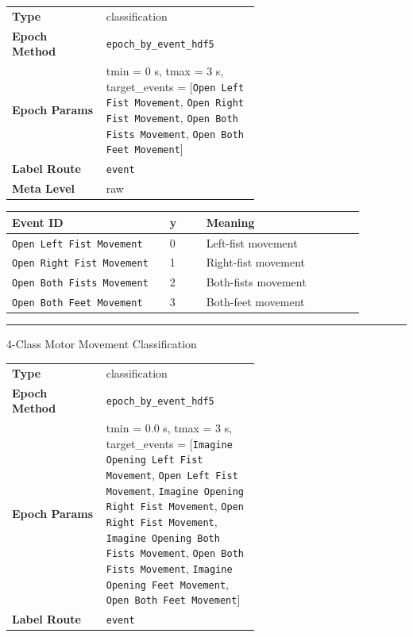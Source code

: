 {\begin{tcolorbox}
{\footnotesize\begin{tabular}{@{}lp{0.62\linewidth}@{}}
\textbf{Type} & classification \\
\textbf{Epoch Method} & \texttt{epoch\_by\_event\_hdf5} \\
\textbf{Epoch Params} & tmin = 0 s, tmax = 3 s, target\_events = [\texttt{Open Left Fist Movement}, \texttt{Open Right Fist Movement}, \texttt{Open Both Fists Movement}, \texttt{Open Both Feet Movement}] \\
\textbf{Label Route} & \texttt{event} \\
\textbf{Meta Level} & raw \\
\end{tabular}}
\par{}\par\smallskip
\begingroup\footnotesize
\begin{tabular}{@{}p{0.3911\linewidth}p{0.0978\linewidth}p{0.3911\linewidth}@{}}
\toprule
\textbf{Event ID} & \textbf{y} & \textbf{Meaning} \\
\midrule
\texttt{Open Left Fist Movement} & 0 & Left-fist movement \\
\texttt{Open Right Fist Movement} & 1 & Right-fist movement \\
\texttt{Open Both Fists Movement} & 2 & Both-fists movement \\
\texttt{Open Both Feet Movement} & 3 & Both-feet movement \\
\bottomrule
\end{tabular}
\endgroup
\noindent\rule{\linewidth}{0.4pt}\par\nopagebreak
{} {\footnotesize 4-Class Motor Movement Classification}\par\smallskip
{\footnotesize\begin{tabular}{@{}lp{0.62\linewidth}@{}}
\textbf{Type} & classification \\
\textbf{Epoch Method} & \texttt{epoch\_by\_event\_hdf5} \\
\textbf{Epoch Params} & tmin = 0.0 s, tmax = 3 s, target\_events = [\texttt{Imagine Opening Left Fist Movement}, \texttt{Open Left Fist Movement}, \texttt{Imagine Opening Right Fist Movement}, \texttt{Open Right Fist Movement}, \texttt{Imagine Opening Both Fists Movement}, \texttt{Open Both Fists Movement}, \texttt{Imagine Opening Feet Movement}, \texttt{Open Both Feet Movement}] \\
\textbf{Label Route} & \texttt{event} \\

\end{tabular}}
\end{tcolorbox}}
